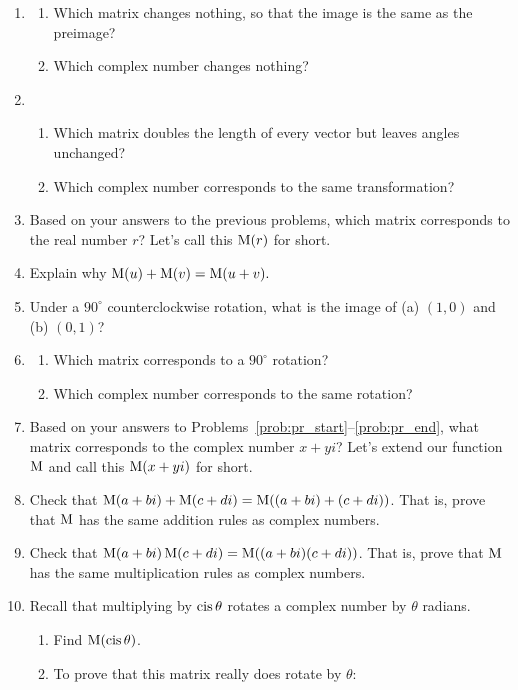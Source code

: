 \documentclass[../textbook.tex]{subfiles}
\begin{document}
\begin{enumerate}
\item \label{prob:pr_start}\begin{enumerate}
\item Which matrix changes nothing, so that the image is the same as the preimage?
\item Which complex number changes nothing?
\end{enumerate}
\item \begin{enumerate}
\item Which matrix doubles the length of every vector but leaves angles unchanged?
\item Which complex number corresponds to the same transformation?
\end{enumerate}
\item Based on your answers to the previous problems, which matrix corresponds to the real number $r$? Let's call this $\operatorname{M} (r)$ for short.
\item Explain why $\operatorname{M} (u)+\operatorname{M}(v)=\operatorname{M}(u+v).$
\item Under a $90^\circ$ counterclockwise rotation, what is the image of (a) $(1,0)$ and (b) $(0,1)$?
\item \label{prob:pr_end}\begin{enumerate}
\item Which matrix corresponds to a $90^\circ$ rotation?
\item Which complex number corresponds to the same rotation?
\end{enumerate}
\item Based on your answers to Problems~\ref{prob:pr_start}--\ref{prob:pr_end}, what matrix corresponds to the complex number $x+yi$? Let's extend our function $\operatorname{M}$ and call this $\operatorname{M} (x+yi)$ for short.
\item Check that $\operatorname{M} (a+bi)+\operatorname{M} (c+di)=\operatorname{M}((a+bi)+(c+di))$. That is, prove that $\operatorname{M}$ has the same addition rules as complex numbers.
\item Check that $\operatorname{M} (a+bi)\operatorname{M} (c+di)=\operatorname{M}((a+bi)(c+di))$. That is, prove that $\operatorname{M}$ has the same multiplication rules as complex numbers.
\item Recall that multiplying by $\operatorname{cis}\theta$ rotates a complex number by $\theta$ radians.
\begin{enumerate}
\item Find $\operatorname{M} (\operatorname{cis}\theta)$.
\item To prove that this matrix really does rotate by $\theta$:
\begin{enumerate}

\end{enumerate}
\end{enumerate}
\end{enumerate}
\end{document}
